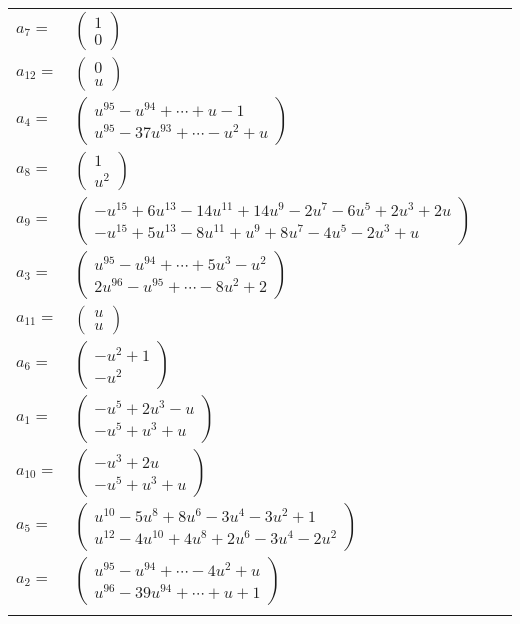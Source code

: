 \documentclass[1p]{elsarticle_modified}
\theoremstyle{definition}
\begin{document}
\begin{tabular}{m{7pt} m{180pt} m{7pt} m{180pt} }
\flushright $a_{7}=$&$\begin{pmatrix}1\\0\end{pmatrix}$ \\
\flushright $a_{12}=$&$\begin{pmatrix}0\\u\end{pmatrix}$ \\
\flushright $a_{4}=$&$\begin{pmatrix}u^{95}- u^{94}+\cdots+u-1\\u^{95}-37 u^{93}+\cdots- u^2+u\end{pmatrix}$ \\
\flushright $a_{8}=$&$\begin{pmatrix}1\\u^2\end{pmatrix}$ \\
\flushright $a_{9}=$&$\begin{pmatrix}- u^{15}+6 u^{13}-14 u^{11}+14 u^9-2 u^7-6 u^5+2 u^3+2 u\\- u^{15}+5 u^{13}-8 u^{11}+u^9+8 u^7-4 u^5-2 u^3+u\end{pmatrix}$ \\
\flushright $a_{3}=$&$\begin{pmatrix}u^{95}- u^{94}+\cdots+5 u^3- u^2\\2 u^{96}- u^{95}+\cdots-8 u^2+2\end{pmatrix}$ \\
\flushright $a_{11}=$&$\begin{pmatrix}u\\u\end{pmatrix}$ \\
\flushright $a_{6}=$&$\begin{pmatrix}- u^2+1\\- u^2\end{pmatrix}$ \\
\flushright $a_{1}=$&$\begin{pmatrix}- u^5+2 u^3- u\\- u^5+u^3+u\end{pmatrix}$ \\
\flushright $a_{10}=$&$\begin{pmatrix}- u^3+2 u\\- u^5+u^3+u\end{pmatrix}$ \\
\flushright $a_{5}=$&$\begin{pmatrix}u^{10}-5 u^8+8 u^6-3 u^4-3 u^2+1\\u^{12}-4 u^{10}+4 u^8+2 u^6-3 u^4-2 u^2\end{pmatrix}$ \\
\flushright $a_{2}=$&$\begin{pmatrix}u^{95}- u^{94}+\cdots-4 u^2+u\\u^{96}-39 u^{94}+\cdots+u+1\end{pmatrix}$\\&\end{tabular}
\end{document}

